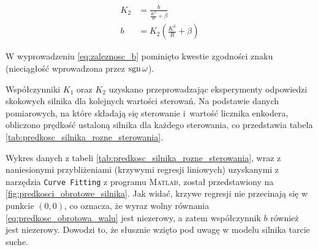 \begin{align}
    K_2 &= \frac{b}{\frac{K^2}{R} + \beta} \nonumber \\
    b &= K_2 \left(\frac{K^2}{R} + \beta \right) \label{eq:zaleznosc_b}
\end{align}

W wyprowadzeniu \eqref{eq:zaleznosc_b} pominięto kwestie zgodności znaku (nieciągłość wprowadzona przez $\operatorname{sgn} \omega$).

Współczynniki $K_1$ oraz $K_2$ uzyskano przeprowadzając eksperymenty odpowiedzi skokowych silnika dla kolejnych wartości sterowań. Na podstawie danych pomiarowych, na które składają się sterowanie i~wartość licznika enkodera, obliczono prędkość ustaloną silnika dla każdego sterowania, co przedstawia tabela \ref{tab:predkosc_silnika_rozne_sterowania}.

Wykres danych z tabeli \ref{tab:predkosc_silnika_rozne_sterowania}, wraz z naniesionymi przybliżeniami (krzywymi regresji liniowych) uzyskanymi z narzędzia \texttt{Curve Fitting} z programu \textsc{Matlab}, został przedstawiony na \cref{fig:predkosci_obrotowe_silnika}. Jak widać, krzywe regresji nie przecinają się w punkcie $(0, 0)$, co oznacza, że wyraz wolny równania \eqref{eq:predkosc_obrotowa_walu} jest niezerowy, a zatem współczynnik $b$ również jest niezerowy. Dowodzi to, że słusznie wzięto pod uwagę w modelu silnika tarcie suche.

